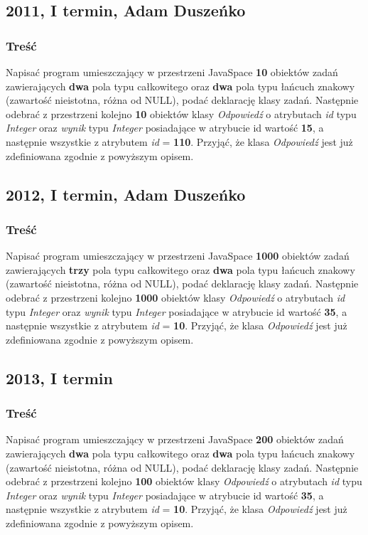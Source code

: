 	\subsection{2011, I termin, Adam Duszeńko}
		\subsubsection{Treść}
			Napisać program umieszczający w przestrzeni JavaSpace \textbf{10} obiektów zadań zawierających \textbf{dwa} pola typu całkowitego oraz \textbf{dwa} pola typu łańcuch znakowy (zawartość nieistotna, różna od NULL), podać deklarację klasy zadań. Następnie odebrać z przestrzeni kolejno \textbf{10} obiektów klasy \textit{Odpowiedź} o atrybutach \textit{id} typu \textit{Integer} oraz \textit{wynik} typu \textit{Integer} posiadające w atrybucie id wartość \textbf{15}, a następnie wszystkie z atrybutem \textit{id} = \textbf{110}. Przyjąć, że klasa \textit{Odpowiedź} jest już zdefiniowana zgodnie z powyższym opisem.
	
	\subsection{2012, I termin, Adam Duszeńko}
		\subsubsection{Treść}
			Napisać program umieszczający w przestrzeni JavaSpace \textbf{1000} obiektów zadań zawierających \textbf{trzy} pola typu całkowitego oraz \textbf{dwa} pola typu łańcuch znakowy (zawartość nieistotna, różna od NULL), podać deklarację klasy zadań. Następnie odebrać z przestrzeni kolejno \textbf{1000} obiektów klasy \textit{Odpowiedź} o atrybutach \textit{id} typu \textit{Integer} oraz \textit{wynik} typu \textit{Integer} posiadające w atrybucie id wartość \textbf{35}, a następnie wszystkie z atrybutem \textit{id} = \textbf{10}. Przyjąć, że klasa \textit{Odpowiedź} jest już zdefiniowana zgodnie z powyższym opisem.
	
	\newpage
	\subsection{2013, I termin}
		\subsubsection{Treść}
			Napisać program umieszczający w przestrzeni JavaSpace \textbf{200} obiektów zadań zawierających \textbf{dwa} pola typu całkowitego oraz \textbf{dwa} pola typu łańcuch znakowy (zawartość nieistotna, różna od NULL), podać deklarację klasy zadań. Następnie odebrać z przestrzeni kolejno \textbf{100} obiektów klasy \textit{Odpowiedź} o atrybutach \textit{id} typu \textit{Integer} oraz \textit{wynik} typu \textit{Integer} posiadające w atrybucie id wartość \textbf{35}, a następnie wszystkie z atrybutem \textit{id} = \textbf{10}. Przyjąć, że klasa \textit{Odpowiedź} jest już zdefiniowana zgodnie z powyższym opisem.
	
